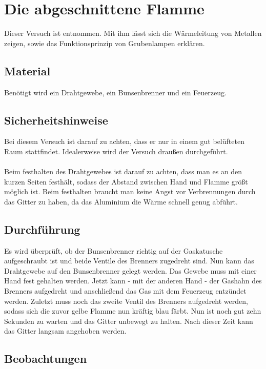 \section{Die abgeschnittene Flamme}

Dieser Versuch ist \cite{Physikanten} entnommen.
Mit ihm lässt sich die Wärmeleitung von Metallen zeigen, sowie das Funktionsprinzip von Grubenlampen erklären.

\subsection{Material}

Benötigt wird ein Drahtgewebe, ein Bunsenbrenner und ein Feuerzeug.

\subsection{Sicherheitshinweise}

Bei diesem Versuch ist darauf zu achten, dass er nur in einem gut belüfteten Raum stattfindet.
Idealerweise wird der Versuch draußen durchgeführt.\\
\\
Beim festhalten des Drahtgewebes ist darauf zu achten, dass man es an den kurzen Seiten festhält, sodass der Abstand zwischen Hand und Flamme größt möglich ist.
Beim festhalten braucht man keine Angst vor Verbrennungen durch das Gitter zu haben, da das Aluminium die Wärme schnell genug abführt.

\subsection{Durchführung}

Es wird überprüft, ob der Bunsenbrenner richtig auf der Gaskatusche aufgeschraubt ist und beide Ventile des Brenners zugedreht sind.
Nun kann das Drahtgewebe auf den Bunsenbrenner gelegt werden.
Das Gewebe muss mit einer Hand fest gehalten werden.
Jetzt kann - mit der anderen Hand - der Gashahn des Brenners aufgedreht und anschließend das Gas mit dem Feuerzeug entzündet werden.
Zuletzt muss noch das zweite Ventil des Brenners aufgedreht werden, sodass sich die zuvor gelbe Flamme nun kräftig blau färbt.
Nun ist noch gut zehn Sekunden zu warten und das Gitter unbewegt zu halten.
Nach dieser Zeit kann das Gitter langsam angehoben werden.

\subsection{Beobachtungen}


